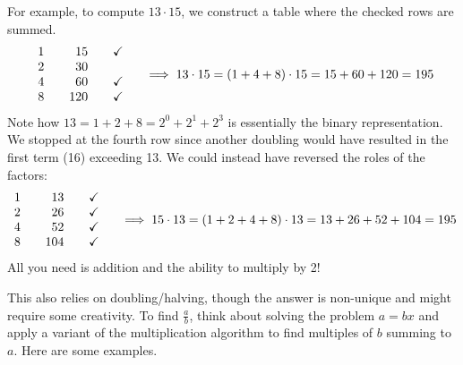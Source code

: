 \goodbreak

For example, to compute $13\cdot 15$, we construct a table where the checked rows are summed.
\[\begin{array}{r@{\qquad}r@{\qquad}c}
1&15&\checkmark\\
2&30&\\
4&60&\checkmark\\
8&120&\checkmark
\end{array}\quad\implies 13\cdot 15=(1+4+8)\cdot 15=15+60+120=195\]
Note how $13=1+2+8=2^0+2^1+2^3$ is essentially the binary representation. We stopped at the fourth row since another doubling would have resulted in the first term (16) exceeding 13. We could instead have reversed the roles of the factors:
\[\begin{array}{r@{\qquad}r@{\qquad}c}
1&13&\checkmark\\
2&26&\checkmark\\
4&52&\checkmark\\
8&104&\checkmark
\end{array}\quad\implies 15\cdot 13=(1+2+4+8)\cdot 13=13+26+52+104=195\]
All you need is addition and the ability to multiply by 2!

 This also relies on doubling/halving, though the answer is non-unique and might require some creativity. To find $\frac ab$, think about solving the problem $a=bx$ and apply a variant of the multiplication algorithm to find multiples of $b$ summing to $a$. Here are some examples.

